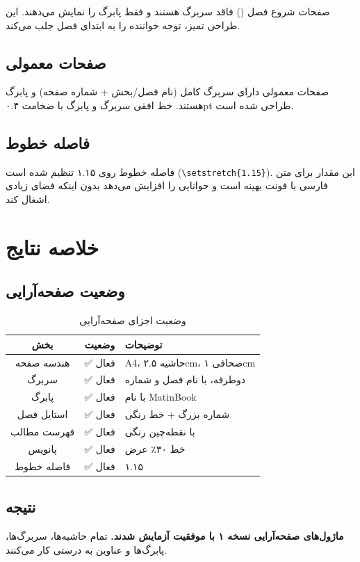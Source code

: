 \documentclass{matinbook}
\begin{document}
صفحات شروع فصل () فاقد سربرگ هستند
و فقط پابرگ را نمایش می‌دهند. این طراحی تمیز،
توجه خواننده را به ابتدای فصل جلب می‌کند.

\section{صفحات معمولی}

صفحات معمولی دارای سربرگ کامل (نام فصل/بخش + شماره صفحه)
و پابرگ هستند. خط افقی سربرگ و پابرگ با ضخامت ۰.۴pt
طراحی شده است.

\section{فاصله خطوط}

فاصله خطوط  روی ۱.۱۵ تنظیم شده است
(\texttt{\textbackslash setstretch\{1.15\}}). این مقدار
برای متن فارسی با فونت  بهینه است
و خوانایی را افزایش می‌دهد بدون اینکه فضای زیادی
اشغال کند.

\chapter{خلاصه نتایج}
\label{chap:summary}

\section{وضعیت صفحه‌آرایی}

\begin{table}[h]
\centering
\caption{وضعیت اجزای صفحه‌آرایی}
\label{tab:layout-status}
\begin{tabular}{|c|c|C{6cm}|}
    \hline
    \textbf{بخش} & \textbf{وضعیت} & \textbf{توضیحات} \\
    \hline
    هندسه صفحه & \textcolor{matingreen}{✅ فعال} & A4، حاشیه ۲.۵cm، صحافی ۱cm \\
    سربرگ & \textcolor{matingreen}{✅ فعال} & دوطرفه، با نام فصل و شماره \\
    پابرگ & \textcolor{matingreen}{✅ فعال} & با نام MatinBook \\
    استایل فصل & \textcolor{matingreen}{✅ فعال} & شماره بزرگ + خط رنگی \\
    فهرست مطالب & \textcolor{matingreen}{✅ فعال} & با نقطه‌چین رنگی \\
    پانویس & \textcolor{matingreen}{✅ فعال} & خط ۳۰٪ عرض \\
    فاصله خطوط & \textcolor{matingreen}{✅ فعال} & ۱.۱۵ \\
    \hline
\end{tabular}
\end{table}

\section{نتیجه}

\textbf{ماژول‌های صفحه‌آرایی  نسخه ۱ با موفقیت آزمایش شدند.}
تمام حاشیه‌ها، سربرگ‌ها، پابرگ‌ها و عناوین به درستی کار می‌کنند. 🎉
\end{document}
